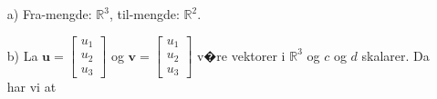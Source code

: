 \documentclass[a4paper, norsk, 12pt]{extarticle}
\begin{document}
\section{}
\begin{itemize}
\item[a)]
Fra-mengde: $\mathbb{R}^3$, til-mengde: $\mathbb{R}^2$.

\item[b)]
La $\boldsymbol{u} = \begin{bmatrix} u_1 \\ u_2 \\ u_3 \end{bmatrix}$ og $\boldsymbol{v} = \begin{bmatrix} u_1 \\ u_2 \\ u_3 \end{bmatrix}$ v�re vektorer i $\mathbb{R}^3$ og $c$ og $d$ skalarer. Da har vi at


\end{itemize}
\end{document}
